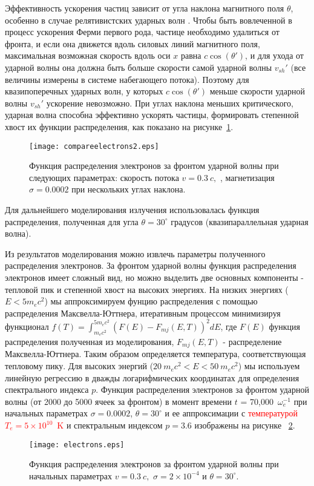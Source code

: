 Эффективность ускорения частиц зависит от угла наклона магнитного поля $\displaystyle\theta$,
особенно в случае релятивистских ударных волн \cite{SironiSpitkovsky2009pair, GuoSironi2014_1, Crumley2019, Romansky2018}. Чтобы быть вовлеченной в процесс ускорения Ферми первого рода, частице необходимо удалиться от фронта, и если
она движется вдоль силовых линий магнитного поля, максимальная возможная скорость вдоль оси $\displaystyle x$ равна $\displaystyle c\cos(\theta')$, и для ухода от ударной волны она должна быть больше скорости самой ударной волны $\displaystyle v_{sh}'$ (все величины измерены в системе набегающего потока). Поэтому для квазипоперечных ударных волн, у которых $c \cos(\theta')$ меньше скорости ударной волны $\displaystyle v_{sh}'$ ускорение невозможно. При углах наклона меньших критического, ударная волна способна эффективно ускорять частицы, формировать степенной хвост их функции распределения, как показано на рисунке~\ref{compareelectrons}.
\begin{figure}
	\centering
	\texttt{[image: compareelectrons2.eps]} 
	\caption{Функция распределения электронов за фронтом ударной волны при следующих параметрах: скорость потока \mbox{$v = 0.3~c,$} , магнетизация $\sigma = 0.0002$ при нескольких углах наклона.}
	\label{compareelectrons}
\end{figure}
 
Для дальнейшего моделирования излучения использовалась функция распределения, полученная для угла $\theta = 30^\circ$ градусов (квазипараллельная ударная волна).
 
Из результатов моделирования можно извлечь параметры полученного распределения электронов. За фронтом ударной волны функция распределения электронов имеет сложный вид, но можно выделить две основных компоненты - тепловой пик и степенной хвост на высоких энергиях.
На низких энергиях ($\displaystyle E < 5 m_e c^2$) мы аппроксимируем фунцию распределения с помощью распределения Максвелла-Юттнера, итеративным процессом минимизируя функционал $\displaystyle f(T) = \int_{m_e c^{2}}^{5 m_e c^{2}} (F(E) - F_{mj}(E,T))^{2}dE$, где $\displaystyle F(E)$ функция распределения полученная из моделирования, $\displaystyle F_{mj}(E,T)$ - распределение Максвелла-Юттнера. Таким образом определяется температура, соответствующая тепловому пику. Для высоких энергий ($\displaystyle 20~m_e c^{2} < E < 50~m_e c^{2}$) мы используем линейную регрессию в дважды логарифмических координатах для определения спектрального индекса $p$. Функция распределения электронов за фронтом ударной волны (от 2000 до 5000 ячеек за фронтом) в момент времени $\displaystyle t$ = 70,000~$\omega_{e}^{-1}$ при начальных параметрах $\displaystyle\sigma = 0.0002$, $\theta = 30^\circ$ и ее аппроксимации с \textcolor{red}{температурой $\displaystyle T_e = 5\times 10^{10}$~K} и спектральным индексом $\displaystyle p = 3.6$ изображены на рисунке ~\ref{electrons}.
\begin{figure}
		\centering
		\texttt{[image: electrons.eps]} 
		\caption{Функция распределения электронов за фронтом ударной волны при начальных параметрах $v = 0.3~c,$ $\sigma = 2\times10^{-4}$ и $\theta = 30^{\circ}$.}
		\label{electrons}
	\end{figure}

